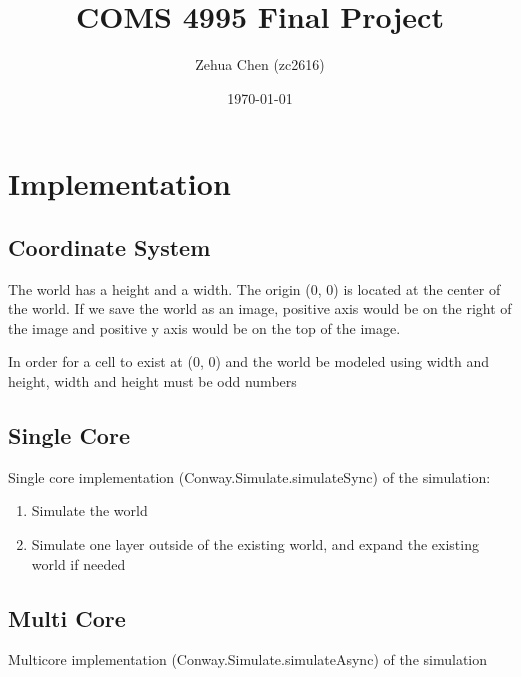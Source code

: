 \documentclass{article}
\title{COMS 4995 Final Project}
\author{Zehua Chen (zc2616)}
\date{\today}
\newcommand{\code}[1]{{\ttfamily #1}}
\begin{document}
  \maketitle
  \tableofcontents

  \setlength{\parskip}{8px}
  \setlength{\parindent}{0px}

  \section{Implementation}

    \subsection{Coordinate System}

      The world has a height and a width. The origin (0, 0) is located at the
      center of the world. If we save the world as an image, positive
      axis would be on the right of the image and positive y axis
      would be on the top of the image.

      In order for a cell to exist at (0, 0) and the world be modeled using
      width and height, width and height must be odd numbers

    \subsection{Single Core}

      Single core implementation (\code{Conway.Simulate.simulateSync})
      of the simulation:

      \begin{enumerate}
        \item Simulate the world
        \item Simulate one layer outside of the existing world, and expand
        the existing world if needed
      \end{enumerate}

    \subsection{Multi Core}

      Multicore implementation (\code{Conway.Simulate.simulateAsync})
      of the simulation
\end{document}
